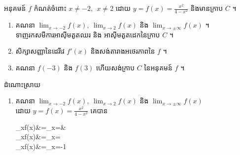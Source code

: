 \documentclass[expologarit]{subfiles}
\begin{document}
អនុគមន៍ $f$ កំណត់ចំពោះ $x\neq -2,\ \ x\neq 2$ ដោយ $y=f(x)=\frac{x^2}{4-x^2}$ និងមានក្រាប $C$ ។ 
		\begin{enumerate}[m]
		\item គណនា $\lim_{x\to -2}f(x),\ \lim_{x\to 2}f(x)$ និង $\lim_{x\to \pm \infty}f(x)$ ។\\
			 ទាញរកសមីការអាស៊ីមតូតឈរ និង អាស៊ីមតូតដេកនៃក្រាប $C$ ។
		\item សិក្សាសញ្ញានៃដេរីវេ $f'(x)$ និងសង់តារាងអថេរភាពនៃ $f$ ។
		\item គណនា $f(-3)$ និង $f(3)$ ហើយសង់ក្រាប $C$ នៃអនុគមន៍ $f$ ។
		\end{enumerate}
	\begin{center}
	\color{violet} \kml ដំណោះស្រាយ
\end{center}		
			\begin{enumerate}[m]
		\item គណនា $\lim_{x\to -2}f(x),\ \lim_{x\to 2}f(x)$ និង $\lim_{x\to \pm \infty}f(x)$ \\[0.25cm]
		ដោយ $y=f(x)=\frac{x^2}{4-x^2}$ គេបាន
		\begin{flalign*}
		\lim_{x}f(x)&=\lim_{x}=\pm\infty\quad {}&\\
		\lim_{x}f(x)&=\lim_{x}=\pm\infty\quad\   \\
				\lim_{x\to \pm\infty}f(x)&=\lim_{x\to \pm \infty}=-1 \quad {}
\end{flalign*}				


\end{enumerate}
\end{document}
